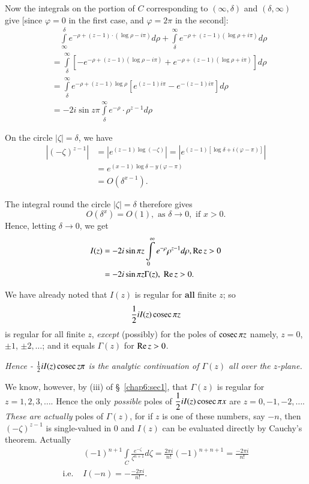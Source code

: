 Now the integrals on the portion of $C$ corresponding to $(\infty,
\delta)$ and $(\delta, \infty)$ give [since $\varphi = 0$ in the first
case, and $\varphi = 2 \pi$ in the second]:
\begin{align*}
&\quad \int\limits^\delta_\infty e^{-\rho + (z-1) \cdot (\log \rho - i \pi)}
d \rho + \int\limits^\infty_\delta e^{-\rho + (z-1) (\log \rho + i
  \pi)} d\rho\\
& =  \int\limits^\infty_\delta \left[-e^{-\rho + (z-1) (\log \rho
    -i\pi)}  + e^{-\rho + (z-1) (\log \rho + i \pi)}\right] d\rho\\
& = \int\limits^\infty_\delta e^{-\rho + (z-1) \log \rho}
\left[e^{(z-1)i\pi} -e^{-(z-1)i\pi} \right] d\rho\\
& = -2 i \sin z\pi \int\limits^\infty_\delta e^{-\rho} \cdot
\rho^{z-1} d\rho
\end{align*}

On the circle $|\zeta| =\delta$, we have
\begin{align*}
|(-\zeta)^{z-1}| & = |e^{(z-1) \log (-\zeta)}| = |e^{(z-1)[\log \delta
+ i (\varphi - \pi)]}|\\
& = e^{(x-1) \log \delta - y (\varphi-\pi)}\\
& = O(\delta^{x-1}).
\end{align*}\pageoriginale 

The integral round the circle $|\zeta| =\delta$ therefore gives 
$$
O(\delta^x) = O(1), \text{ as } \delta \to 0, \text{ if } x > 0.
$$
Hence, letting $\delta \to 0$, we get
\begin{align*}
I(z) & = - 2 i \sin \pi z \int\limits^{\infty}_0 e^{-\rho} \rho^{z-1}
d\rho, \operatorname{Re} z > 0\\
& = - 2 i \sin \pi z \Gamma (z), \; \operatorname{Re} z > 0.
\end{align*}

We have already noted that $I(z)$ is regular for {\bf all} finite $z$; so 
$$
\frac{1}{2} i I (z) \operatorname{cosec} \pi z
$$
is regular for all finite $z$, {\em except} (possibly) for the poles of
$\operatorname{cosec} \pi z$ namely, $z=0$, $\pm 1$, $\pm 2, \ldots $; and it equals
$\Gamma (z)$ for $\operatorname{Re} z > 0$.

\textit{Hence  - $\frac{1}{2} i I (z) \operatorname{cosec} z \pi$ is the analytic
  continuation of $\Gamma (z)$ all over the $z$-plane.}

We know, however, by (iii) of \S\ \ref{chap6:sec1}, that $\Gamma (z)$ is regular for
$z=1,2,3,\ldots$. Hence the only {\em possible} poles of $\dfrac{1}{2}i I
(z) \operatorname{cosec} \pi x$ are $z =0,-1,-2, \ldots$. {\em These are actually} poles
of $\Gamma (z)$, for if $z$ is one of these numbers, say $-n$, then
$(-\zeta)^{z-1}$ is single-valued in $0$ and $I(z)$ can be evaluated
directly by Cauchy's theorem. Actually
\begin{align*}
& (-1)^{n+1} \int\limits_C \frac{e^{-\zeta}}{\zeta^{n+1}} d\zeta =
  \frac{2\pi i}{n!} (-1)^{n+n+1} =  \frac{-2\pi i}{n!}\\
\text{i.e. } & I(-n) = - \frac{-2\pi i}{n!}.
\end{align*}

